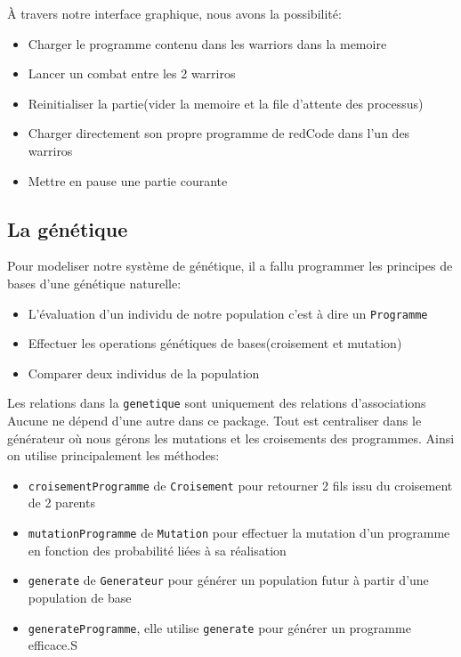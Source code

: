 \documentclass[12pt]{article}
\newcommand{\packagename}[1]{\texttt{#1}}
\newcommand{\classname}[1]{\texttt{#1}}
\newcommand{\methodname}[1]{\texttt{#1}}
\begin{document}
À travers notre interface graphique, nous avons la possibilité:
\begin{itemize}
	\item Charger le programme contenu dans les warriors dans la memoire
	\item Lancer un combat entre les 2 warriros
	\item Reinitialiser la partie(vider la memoire et la file d'attente des processus)
	\item Charger directement son propre programme de redCode dans l'un des warriros
	\item Mettre en pause une partie courante
\end{itemize}

\subsection{La génétique}
Pour modeliser notre système de génétique, il a fallu programmer les principes de bases d'une génétique
naturelle:
\begin{itemize}
	\item L'évaluation d'un individu de notre population c'est à dire un \classname{Programme}
	\item Effectuer les operations génétiques de bases(croisement et mutation)
	\item Comparer deux individus de la population
\end{itemize}
Les relations dans la \packagename{genetique} sont uniquement des relations d'associations
Aucune ne dépend d'une autre dans ce package. Tout est centraliser dans le générateur où nous
gérons les mutations et les croisements des programmes. Ainsi on utilise principalement les méthodes:
\begin{itemize}
	\item \methodname{croisementProgramme} de \classname{Croisement} pour retourner 2 fils issu du croisement de 2 parents
	\item \methodname{mutationProgramme} de \classname{Mutation} pour effectuer la mutation d'un programme en fonction des probabilité
		liées à sa réalisation
	\item \methodname{generate} de \classname{Generateur} pour générer un population futur à partir d'une population de base
	\item \methodname{generateProgramme}, elle utilise \methodname{generate} pour générer un programme efficace.S
\end{itemize}
\end{document}
